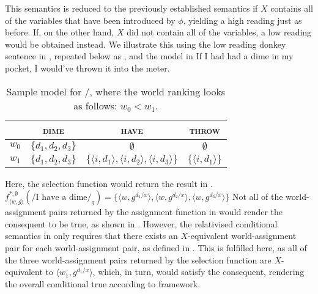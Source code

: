 This semantics is reduced to the previously established semantics if $X$ contains all of the variables that have been introduced by $\phi$, yielding a high reading just as before. If, on the other hand, $X$ did not contain all of the variables, a low reading would be obtained instead. We illustrate this using the low reading donkey sentence in , repeated below as , and the model in  \parencite[due][]{Walker2015}
\ex{}
If I had had a dime in my pocket, I would've thrown it into the meter.\\\emptyfill\parencites[adapted from][]{Schubert1987}[p.~395]{vanRooij2006}
\xe
\begin{table}[!htb]
\caption{Sample model for /, where the world ranking looks as follows: $w_0<w_1$.}
    \begin{tabular}{lccc}\toprule
            & {\scshape dime} & {\scshape have} & {\scshape throw}\\\midrule
            $w_0$ & $\{d_1,d_2,d_3\}$ & $\emptyset$ & $\emptyset$\\
            $w_1$ & $\{d_1,d_2,d_3\}$ & $\{\langle i,d_1\rangle,\langle i,d_2\rangle,\langle i,d_3\rangle\}$ & $\{\langle i,d_1\rangle\}$\\
          \bottomrule
    \end{tabular}
\end{table}

\noindent Here, the selection function would return the result in .
\ex{}
$f^{*,\emptyset}_{\langle w,g\rangle}(/\text{I have a dime}/_g)=\{\langle w,g^{d_1/x}\rangle,\langle w,g^{d_2/x}\rangle,\langle w,g^{d_3/x}\rangle\}$
\xe
Not all of the world-assignment pairs returned by the assignment function in  would render the consequent to be true, as shown in . However, the relativised conditional semantics in  only requires that there exists an $X$-equivalent world-assignment pair for each world-assignment pair, as defined in . This is fulfilled here, as all of the three world-assignment pairs returned by the selection function are $X$-equivalent to $\langle w_1,g^{d_1/x}\rangle$, which, in turn, would satisfy the consequent, rendering the overall conditional true according to  framework.

